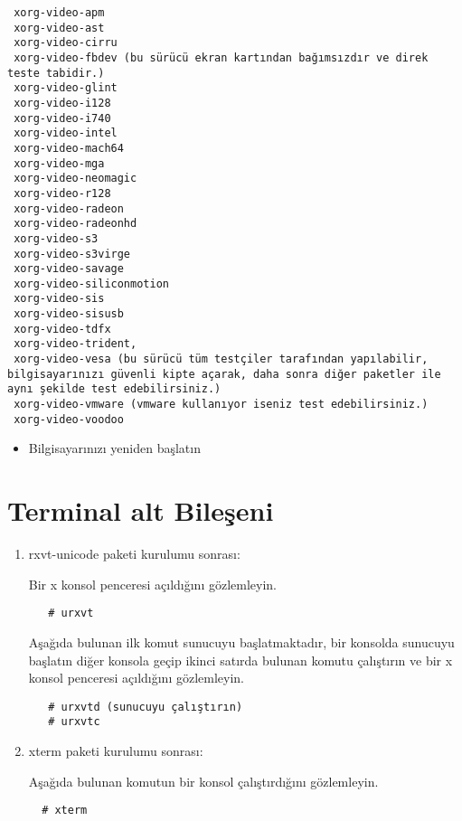 \documentclass[a4paper,10pt]{article}
\begin{document}
\begin{enumerate}
\begin{verbatim}
 xorg-video-apm 
 xorg-video-ast
 xorg-video-cirru
 xorg-video-fbdev (bu sürücü ekran kartından bağımsızdır ve direk teste tabidir.)
 xorg-video-glint
 xorg-video-i128
 xorg-video-i740
 xorg-video-intel
 xorg-video-mach64
 xorg-video-mga
 xorg-video-neomagic
 xorg-video-r128
 xorg-video-radeon
 xorg-video-radeonhd
 xorg-video-s3
 xorg-video-s3virge
 xorg-video-savage
 xorg-video-siliconmotion
 xorg-video-sis
 xorg-video-sisusb
 xorg-video-tdfx
 xorg-video-trident,
 xorg-video-vesa (bu sürücü tüm testçiler tarafından yapılabilir, bilgisayarınızı güvenli kipte açarak, daha sonra diğer paketler ile aynı şekilde test edebilirsiniz.)
 xorg-video-vmware (vmware kullanıyor iseniz test edebilirsiniz.)
 xorg-video-voodoo
\end{verbatim}

\begin{itemize}
 \item Bilgisayarınızı yeniden başlatın
\end{itemize}

\end{enumerate}

\section{Terminal alt Bileşeni}
\begin{enumerate}
 \item rxvt-unicode paketi kurulumu sonrası:

Bir x konsol penceresi açıldığını gözlemleyin.
  \begin{verbatim}
   # urxvt
  \end{verbatim}

Aşağıda bulunan ilk komut sunucuyu başlatmaktadır, bir konsolda sunucuyu başlatın diğer konsola geçip ikinci satırda bulunan komutu çalıştırın ve bir x konsol penceresi açıldığını gözlemleyin.
  \begin{verbatim}
   # urxvtd (sunucuyu çalıştırın)
   # urxvtc
  \end{verbatim}

\item xterm paketi kurulumu sonrası:

Aşağıda bulunan komutun bir konsol çalıştırdığını gözlemleyin.
 \begin{verbatim}
  # xterm
 \end{verbatim}

\end{enumerate}
\end{document}
